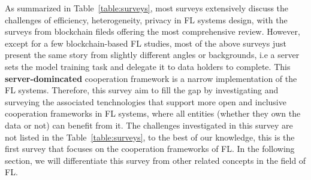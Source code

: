 As summarized in Table~\ref{table:surveys}, most surveys extensively discuss the challenges of efficiency, heterogeneity, privacy in FL systems design, with the surveys from blockchain fileds offering the most comprehensive review.
However, except for a few blockchain-based FL studies, most of the above surveys just present the same story from slightly different angles or backgrounds, i.e a server sets the model training task and delegate it to data holders to complete. 
This \textbf{server-domincated} cooperation framework is a narrow implementation of the FL systems.
Therefore, this survey aim to fill the gap by investigating and surveying the associated tenchnologies that support more open and inclusive cooperation frameworks in FL systems, where all entities (whether they own the data or not) can benefit from it. 
The challenges investigated in this survey are not listed in the Table~\ref{table:surveys}, to the best of our knowledge, this is the first survey that focuses on the cooperation frameworks of FL.
In the following section, we will differentiate this survey from other related concepts in the field of FL.

